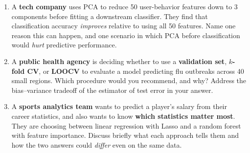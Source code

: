 \documentclass[11pt]{article}
\begin{document}
\begin{enumerate}[leftmargin=*, resume]
\item A \textbf{tech company} uses PCA to reduce 50 user-behavior features down to 3 components before fitting a downstream classifier. They find that classification accuracy \emph{improves} relative to using all 50 features. Name one reason this can happen, and one scenario in which PCA before classification would \emph{hurt} predictive performance.

\item A \textbf{public health agency} is deciding whether to use a \textbf{validation set}, \textbf{$k$-fold CV}, or \textbf{LOOCV} to evaluate a model predicting flu outbreaks across 40 small regions. Which procedure would you recommend, and why? Address the bias--variance tradeoff of the estimator of test error in your answer.

\item A \textbf{sports analytics team} wants to predict a player's salary from their career statistics, and also wants to know \textbf{which statistics matter most}. They are choosing between linear regression with Lasso and a random forest with feature importance. Discuss briefly what each approach tells them and how the two answers could \emph{differ} even on the same data.

\end{enumerate}
\end{document}
